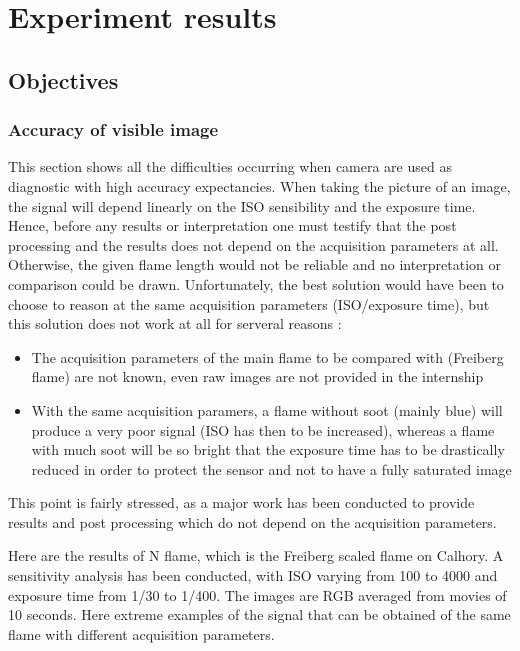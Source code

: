 \renewcommand\evenpagerightmark{{\scshape\small Experiment results}}
\chapter[Experiment results]%
{Experiment results}
\label{experiment_chapt}

\section{Objectives}


\subsection{Accuracy of visible image }

This section shows all the difficulties occurring when camera are used as diagnostic with high accuracy expectancies.  When taking the picture of an image, the signal will 
depend linearly on the ISO sensibility and the exposure time. Hence, before any results or interpretation one must testify that the 
post processing and the results does not depend on the acquisition parameters at all. Otherwise, 
the given flame length would not be reliable and no interpretation or comparison could be drawn. 
Unfortunately, the best solution would have been to choose to reason at the same acquisition parameters (ISO/exposure time), 
but this solution does not work at all for serveral reasons :

\begin{itemize}
\item The acquisition parameters of the main flame to be compared with (Freiberg flame) are not known, even raw images are not provided in the internship
\item With the same acquisition paramers, a flame without soot (mainly blue) will produce a very poor signal (ISO has then to be increased), whereas a flame with much soot will be so bright that the exposure time has to be drastically reduced in order to protect the sensor and not to have a fully saturated image
\end{itemize}

This point is fairly stressed, as a major work has been conducted to provide results and post processing which do not depend on the acquisition parameters.

Here are the results of N flame, which is the Freiberg scaled flame on Calhory. A sensitivity analysis has been conducted, with ISO varying from 100 to 4000 and exposure time from 1/30 to 1/400. The images are RGB averaged from movies of 10 seconds. Here extreme examples of the signal that can be obtained of the same flame with different acquisition parameters.

